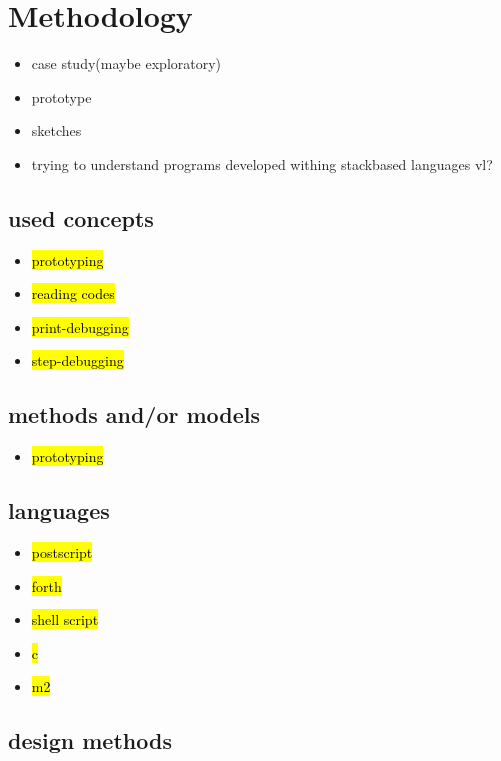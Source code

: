 \chapter{Methodology}

\begin{itemize}
\item case study(maybe exploratory)
\item prototype
\item sketches
\item trying to understand programs developed withing stackbased languages vl?
\end{itemize}



\section{used concepts}

\begin{itemize}
\item \hl{prototyping}
\item \hl{reading codes}
\item \hl{print-debugging}
\item \hl{step-debugging}
\end{itemize}

\section{methods and/or models}

\begin{itemize}
\item \hl{prototyping}
\end{itemize}

\section{languages}

\begin{itemize}
\item \hl{postscript}
\item \hl{forth}
\item \hl{shell script}
\item \hl{c}
\item \hl{m2}
\end{itemize}


\section{design methods}

